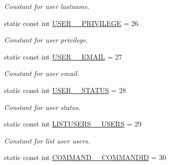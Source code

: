 \begin{DoxyCompactItemize}
\begin{DoxyCompactList}\small\item\em Constant for user lastname. \item\end{DoxyCompactList}\item 
\hypertarget{classUMS__Data_1_1UMS__DataPackage_a1000bc7d2dba29b5a2b45686d4df44f4}{
static const int \hyperlink{classUMS__Data_1_1UMS__DataPackage_a1000bc7d2dba29b5a2b45686d4df44f4}{USER\_\-\_\-PRIVILEGE} = 26}
\label{classUMS__Data_1_1UMS__DataPackage_a1000bc7d2dba29b5a2b45686d4df44f4}

\begin{DoxyCompactList}\small\item\em Constant for user privilege. \item\end{DoxyCompactList}\item 
\hypertarget{classUMS__Data_1_1UMS__DataPackage_a05f15561eabac8c1bfc7e3fb51391af2}{
static const int \hyperlink{classUMS__Data_1_1UMS__DataPackage_a05f15561eabac8c1bfc7e3fb51391af2}{USER\_\-\_\-EMAIL} = 27}
\label{classUMS__Data_1_1UMS__DataPackage_a05f15561eabac8c1bfc7e3fb51391af2}

\begin{DoxyCompactList}\small\item\em Constant for user email. \item\end{DoxyCompactList}\item 
\hypertarget{classUMS__Data_1_1UMS__DataPackage_a3c4d857fa9111f78b9470786610cc38f}{
static const int \hyperlink{classUMS__Data_1_1UMS__DataPackage_a3c4d857fa9111f78b9470786610cc38f}{USER\_\-\_\-STATUS} = 28}
\label{classUMS__Data_1_1UMS__DataPackage_a3c4d857fa9111f78b9470786610cc38f}

\begin{DoxyCompactList}\small\item\em Constant for user status. \item\end{DoxyCompactList}\item 
\hypertarget{classUMS__Data_1_1UMS__DataPackage_a970048f08cb0d87702834e2b5a898183}{
static const int \hyperlink{classUMS__Data_1_1UMS__DataPackage_a970048f08cb0d87702834e2b5a898183}{LISTUSERS\_\-\_\-USERS} = 29}
\label{classUMS__Data_1_1UMS__DataPackage_a970048f08cb0d87702834e2b5a898183}

\begin{DoxyCompactList}\small\item\em Constant for list user users. \item\end{DoxyCompactList}\item 
\hypertarget{classUMS__Data_1_1UMS__DataPackage_ad310f27f63dbf45d574898c2d03e8ca5}{
static const int \hyperlink{classUMS__Data_1_1UMS__DataPackage_ad310f27f63dbf45d574898c2d03e8ca5}{COMMAND\_\-\_\-COMMANDID} = 30}
\label{classUMS__Data_1_1UMS__DataPackage_ad310f27f63dbf45d574898c2d03e8ca5}


\end{DoxyCompactItemize}
